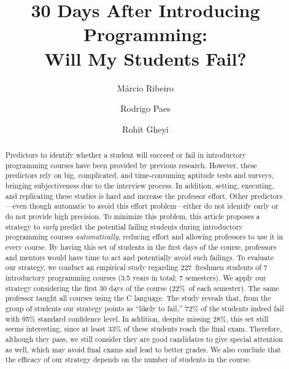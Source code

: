 \documentclass[review]{elsarticle}
\newcommand{\totalStudents}{227~}
\newcommand{\semesterPercentage}{22\%~}
\begin{document}
\begin{frontmatter}

\title{30 Days After Introducing Programming:\\Will My Students Fail?}



\author[ufal]{M\'{a}rcio Ribeiro}

\author[ufal]{Rodrigo Paes}

\author[ufcg]{Rohit Gheyi}

\address[ufal]{Federal University of Alagoas, Macei\'{o}, Brazil}
\address[ufcg]{Federal University of Campina Grande, Campina Grande, Brazil}

\begin{abstract}
Predictors to identify whether a student will succeed or fail in introductory programming courses have been provided by previous research. However, these predictors rely on big, complicated, and time-consuming aptitude tests and surveys, bringing subjectiveness due to the interview process. In addition, setting, executing, and replicating these studies is hard and increase the professor effort. Other predictors---even though automatic to avoid this effort problem---either do not identify early or do not provide high precision. To minimize this problem, this article proposes a strategy to \textit{early} predict the potential failing students during introductory programming courses \textit{automatically}, reducing effort and allowing professors to use it in every course. By having this set of students in the first days of the course, professors and mentors would have time to act and potentially avoid such failings. To evaluate our strategy, we conduct an empirical study regarding \totalStudents freshmen students of 7 introductory programming courses (3.5 years in total; 7 semesters). We apply our strategy considering the first 30 days of the course (\semesterPercentage of each semester). The same professor taught all courses using the C language. The study reveals that, from the group of students our strategy points as ``likely to fail,'' 72\% of the students indeed fail with 95\% standard confidence level. In addition, despite missing 28\%, this set still seems interesting, since at least 33\% of these students reach the final exam. Therefore, although they pass, we still consider they are good candidates to give special attention as well, which may avoid final exams and lead to better grades. We also conclude that the efficacy of our strategy depends on the number of students in the course.



\end{abstract}
\end{frontmatter}
\end{document}
